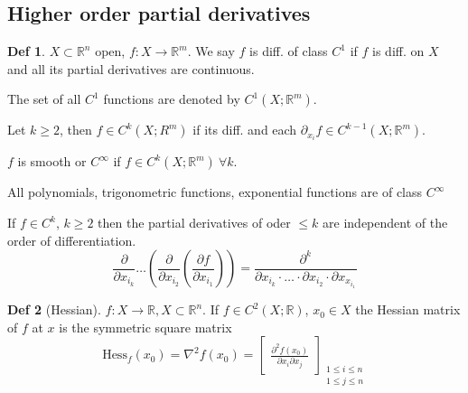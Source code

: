 \documentclass[a4paper, 10pt]{article}
\theoremstyle{definition}
\newtheorem*{definition}{Def}
\newcommand{\R}{\mathbb{R}}
\newcommand{\Hess}{\text{Hess}}
\begin{document}
\subsection{Higher order partial derivatives}
\begin{definition}
    \(X \subset \R^n\) open, \(f: X \to \R^m\). We say \(f\) is diff. of class \(C^1\) if \(f\) is diff. on \(X\) and all its partial derivatives are continuous.

    The set of all \(C^1\) functions are denoted by \(C^1(X ; \R^m)\).

    Let \(k \geq 2\), then \(f \in C^k(X; R^m)\) if its diff. and each \(\partial_{x_i}f \in C^{k - 1}(X; \R^m)\).

    \(f\) is smooth or \(C^\infty\) if \(f \in C^k(X; \R^m) \ \forall k\).
\end{definition}

\begin{note*}
    All polynomials, trigonometric functions, exponential functions are of class \(C^\infty\)
\end{note*}

\begin{ntheorem*}
    If \(f \in C^k\), \(k \geq 2\) then the partial derivatives of oder \(\leq k\) are independent of the order of differentiation.
    \[\frac{\partial}{\partial x_{i_k}} \dots \left(\frac{\partial}{\partial x_{i_2}}\left(\frac{\partial f}{\partial x_{i_1}}\right)\right) = \frac{\partial^k}{\partial x_{i_k} \cdot \ldots \cdot \partial x_{i_2} \cdot \partial x_{x_{i_1}}}\]
\end{ntheorem*}

\begin{definition}[Hessian]
    \(f: X \to \R, X \subset \R^n\). If \(f \in C^2(X;\R)\), \(x_0 \in X\) the Hessian matrix of \(f\) at \(x\) is the symmetric square matrix
    \[\Hess_f(x_0) = \nabla^2 f(x_0) = \begin{bmatrix}
        \frac{\partial^2 f(x_0)}{\partial x_i \partial x_j}
    \end{bmatrix}_{\substack{1 \leq i \leq n \\ 1 \leq j \leq n}}\]
\end{definition}
\end{document}
